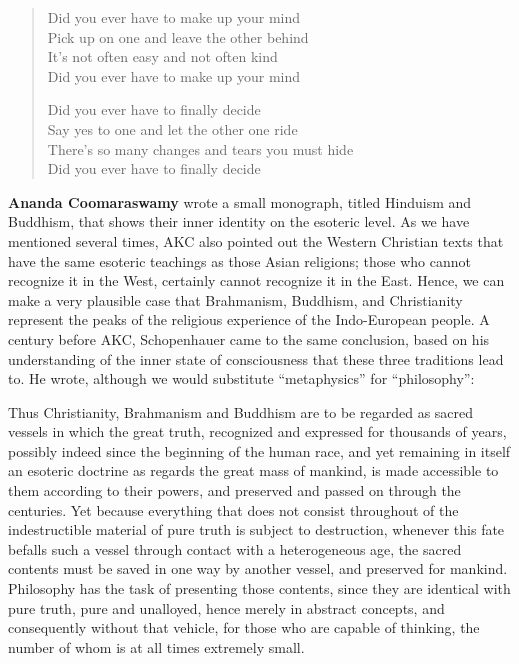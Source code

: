 \begin{verse}
Did you ever have to make up your mind\\
Pick up on one and leave the other behind\\
It's not often easy and not often kind\\
Did you ever have to make up your mind

Did you ever have to finally decide\\
Say yes to one and let the other one ride\\
There's so many changes and tears you must hide\\
Did you ever have to finally decide
\end{verse}

\textbf{Ananda Coomaraswamy} wrote a small monograph, titled {Hinduism and Buddhism}, that shows their inner identity on the esoteric level. As we have mentioned several times, AKC also pointed out the Western Christian texts that have the same esoteric teachings as those Asian religions; those who cannot recognize it in the West, certainly cannot recognize it in the East. Hence, we can make a very plausible case that Brahmanism, Buddhism, and Christianity represent the peaks of the religious experience of the Indo-European people. A century before AKC, Schopenhauer came to the same conclusion, based on his understanding of the inner state of consciousness that these three traditions lead to. He wrote, although we would substitute ``metaphysics'' for ``philosophy'':

\begin{quotex}
Thus Christianity, Brahmanism and Buddhism are to be regarded as sacred vessels in which the great truth, recognized and expressed for thousands of years, possibly indeed since the beginning of the human race, and yet remaining in itself an esoteric doctrine as regards the great mass of mankind, is made accessible to them according to their powers, and preserved and passed on through the centuries. Yet because everything that does not consist throughout of the indestructible material of pure truth is subject to destruction, whenever this fate befalls such a vessel through contact with a heterogeneous age, the sacred contents must be saved in one way by another vessel, and preserved for mankind. Philosophy has the task of presenting those contents, since they are identical with pure truth, pure and unalloyed, hence merely in abstract concepts, and consequently without that vehicle, for those who are capable of thinking, the number of whom is at all times extremely small.
\end{quotex}


